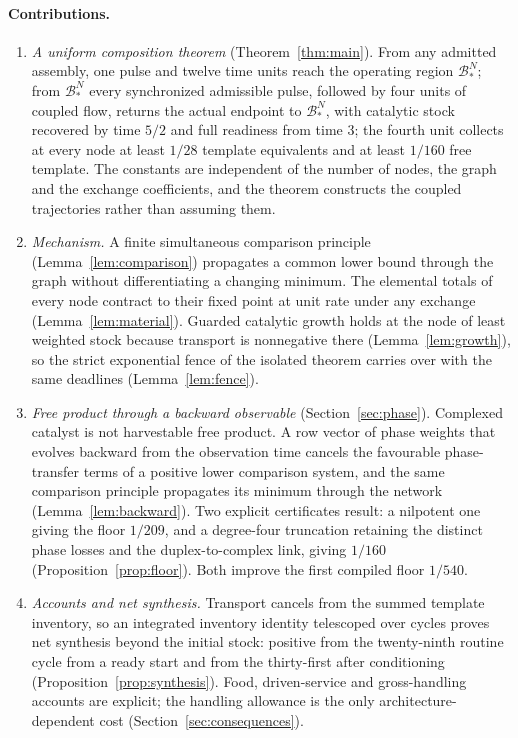 \documentclass[11pt,a4paper]{article}
\theoremstyle{plain}
\theoremstyle{definition}
\theoremstyle{remark}
\newcommand{\Bstar}{\mathcal B_*}
\begin{document}
\paragraph{Contributions.}
\begin{enumerate}[label=(\roman*)]
\item \emph{A uniform composition theorem} (Theorem~\ref{thm:main}). From any admitted assembly, one pulse and twelve time units reach the operating region $\Bstar^N$; from $\Bstar^N$ every synchronized admissible pulse, followed by four units of coupled flow, returns the actual endpoint to $\Bstar^N$, with catalytic stock recovered by time $5/2$ and full readiness from time $3$; the fourth unit collects at every node at least $1/28$ template equivalents and at least $1/160$ free template. The constants are independent of the number of nodes, the graph and the exchange coefficients, and the theorem constructs the coupled trajectories rather than assuming them.
\item \emph{Mechanism.} A finite simultaneous comparison principle (Lemma~\ref{lem:comparison}) propagates a common lower bound through the graph without differentiating a changing minimum. The elemental totals of every node contract to their fixed point at unit rate under any exchange (Lemma~\ref{lem:material}). Guarded catalytic growth holds at the node of least weighted stock because transport is nonnegative there (Lemma~\ref{lem:growth}), so the strict exponential fence of the isolated theorem carries over with the same deadlines (Lemma~\ref{lem:fence}).
\item \emph{Free product through a backward observable} (Section~\ref{sec:phase}). Complexed catalyst is not harvestable free product. A row vector of phase weights that evolves backward from the observation time cancels the favourable phase-transfer terms of a positive lower comparison system, and the same comparison principle propagates its minimum through the network (Lemma~\ref{lem:backward}). Two explicit certificates result: a nilpotent one giving the floor $1/209$, and a degree-four truncation retaining the distinct phase losses and the duplex-to-complex link, giving $1/160$ (Proposition~\ref{prop:floor}). Both improve the first compiled floor $1/540$.
\item \emph{Accounts and net synthesis.} Transport cancels from the summed template inventory, so an integrated inventory identity telescoped over cycles proves net synthesis beyond the initial stock: positive from the twenty-ninth routine cycle from a ready start and from the thirty-first after conditioning (Proposition~\ref{prop:synthesis}). Food, driven-service and gross-handling accounts are explicit; the handling allowance is the only architecture-dependent cost (Section~\ref{sec:consequences}).

\end{enumerate}
\end{document}
